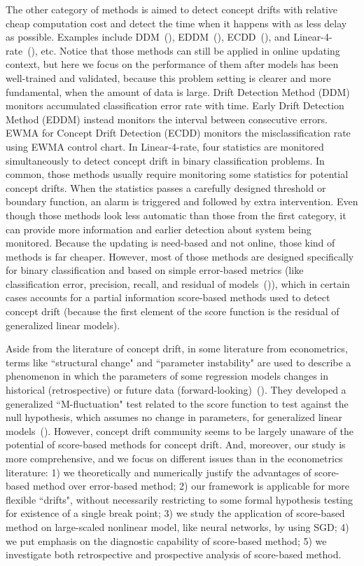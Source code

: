 \documentclass[twoside,11pt]{article}
\begin{document}
The other category of methods is aimed to detect concept drifts with relative cheap computation cost and detect the time when it happens with as less delay as possible. Examples include DDM~(\cite{gama2004learning}), EDDM~(\cite{baena2006early}), ECDD~(\cite{ross2012exponentially}), and Linear-4-rate~(\cite{wang2015concept}), etc. Notice that those methods can still be applied in online updating context, but here we focus on the performance of them after models has been well-trained and validated, because this problem setting is clearer and more fundamental, when the amount of data is large. Drift Detection Method (DDM)~\cite{gama2004learning} monitors accumulated classification error rate with time. Early Drift Detection Method (EDDM) instead monitors the interval between consecutive errors. EWMA for Concept Drift Detection (ECDD) monitors the misclassification rate using EWMA control chart. In Linear-4-rate, four statistics are monitored simultaneously to detect concept drift in binary classification problems. In common, those methods usually require monitoring some statistics for potential concept drifts. When the statistics passes a carefully designed threshold or boundary function, an alarm is triggered and followed by extra intervention. Even though those methods look less automatic than those from the first category, it can provide more information and earlier detection about system being monitored. Because the updating is need-based and not online, those kind of methods is far cheaper. However, most of those methods are designed specifically for binary classification and based on simple error-based metrics (like classification error, precision, recall, and residual of models~(\cite{barros2018large,wang2015concept})), which in certain cases accounts for a partial information score-based methods used to detect concept drift (because the first element of the score function is the residual of generalized linear models).

Aside from the literature of concept drift, in some literature from econometrics, terms like ``structural change" and ``parameter instability" are used to describe a phenomenon in which the parameters of some regression models changes in historical (retrospective) or future data (forward-looking)~(\cite{zeileis2005unified}). They developed a generalized ``M-fluctuation" test related to the score function to test against the null hypothesis, which assumes no change in parameters, for generalized linear models~(\cite{zeileis2007generalized}). However, concept drift community seems to be largely unaware of the potential of score-based methods for concept drift. And, moreover, our study is more comprehensive, and we focus on different issues than in the econometrics literature: 1) we theoretically and numerically justify the advantages of score-based method over error-based method; 2) our framework is applicable for more flexible ``drifts", without necessarily restricting to some formal hypothesis testing for existence of a single break point; 3) we study the application of score-based method on large-scaled nonlinear model, like neural networks, by using SGD; 4) we put emphasis on the diagnostic capability of score-based method; 5) we investigate both retrospective and prospective analysis of score-based method.
\end{document}
